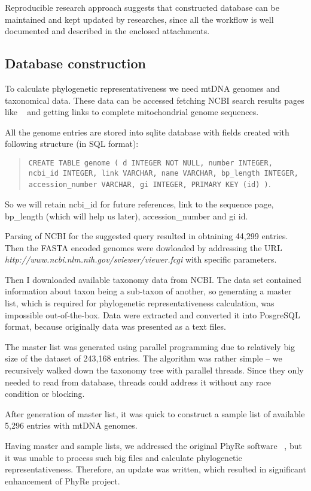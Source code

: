 \documentclass[a4paper,11pt]{article}
\begin{document}
Reproducible research approach suggests that constructed database can be maintained and kept updated by researches, since all the workflow is well documented and described in the enclosed attachments.

\subsection{Database construction}
To calculate phylogenetic representativeness we need mtDNA genomes and taxonomical data. These data can be accessed fetching NCBI search results pages like ~\cite{federhen2012ncbi} and getting links to complete mitochondrial genome sequences.

All the genome entries are stored into sqlite database with fields created with following structure (in SQL format): 
\begin{quote}
\texttt{CREATE TABLE genome ( d INTEGER NOT NULL, number INTEGER, ncbi\_id INTEGER,  link VARCHAR, name VARCHAR, bp\_length INTEGER, accession\_number VARCHAR, gi INTEGER, PRIMARY KEY (id) )}.  
\end{quote}
So we will retain ncbi\_id for future references, link to the sequence page, bp\_length (which will help us later), accession\_number and gi id.

Parsing of NCBI for the suggested query resulted in obtaining 44,299 entries. Then the FASTA encoded genomes were dowloaded by addressing the URL \emph{http://www.ncbi.nlm.nih.gov/sviewer/viewer.fcgi} with specific parameters. 

Then I downloaded available taxonomy data from NCBI. The data set contained information about taxon being a sub-taxon of another, so generating a master list, which is required for phylogenetic representativeness calculation, was impossible out-of-the-box. Data were extracted and converted it into PosgreSQL format, because originally data was presented as a text files. 

The master list was generated using parallel programming due to relatively big size of the dataset  of 243,168 entries. The algorithm was rather simple -- we recursively walked down the taxonomy tree with parallel threads. Since they only needed to read from database, threads could address it without any race condition or blocking.

After generation of master list, it was quick to construct a sample list of available 5,296 entries with mtDNA genomes.

Having master and sample lists, we addressed the original PhyRe software ~\cite{plazzi2010phylogenetic}, but it was unable to process such big files and calculate phylogenetic representativeness. Therefore, an update was written, which resulted in significant enhancement of PhyRe project. 
\end{document}
